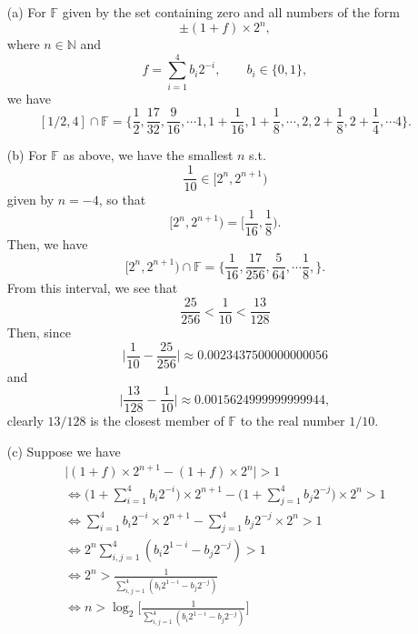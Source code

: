 
\begin{itemize}
    \item[(a)]
        For $\mathbb{F}$ given by the set containing zero and all numbers
        of the form
        \[
           \pm (1 + f) \times 2^n, 
        \]
        where $n \in \mathbb{N}$ and
        \[
            f = \sum_{i=1}^4 b_i 2^{-i}, \qquad b_i \in \lbrace 0, 1 \rbrace,
        \]
        we have
        \[
            [1/2, 4] \cap \mathbb{F} = \biggl\lbrace \frac{1}{2}, \frac{17}{32}, 
            \frac{9}{16}, \dotsb
            1, 1 + \frac{1}{16}, 1 + \frac{1}{8}, \dotsb, 2, 2 + \frac{1}{8},
            2 + \frac{1}{4}, \dotsb 4 \biggr\rbrace.
        \]
    \item[(b)]
        For $\mathbb{F}$ as above, we have the smallest $n$ s.t. 
        \[
            \frac{1}{10} \in [2^n, 2^{n+1})
        \]
        given by $n = -4$, so that
        \[
            [2^n, 2^{n+1}) = \biggl[\frac{1}{16}, \frac{1}{8}\biggr).
        \]
        Then, we have
        \[
            [2^n, 2^{n+1}) \cap \mathbb{F} = \biggl\lbrace \frac{1}{16}, 
            \frac{17}{256}, \frac{5}{64}, \dotsb \frac{1}{8}, \biggr\rbrace.
        \]
        From this interval, we see that
        \[
            \frac{25}{256} < \frac{1}{10} < \frac{13}{128}
        \]
        Then, since 
        \[
            \biggl\lvert \frac{1}{10} - \frac{25}{256} \biggr\rvert \approx 
            0.0023437500000000056
        \]
        and
        \[
            \biggl\lvert \frac{13}{128} - \frac{1}{10} \biggr\rvert \approx 
            0.0015624999999999944,
        \]
        clearly $13/128$ is the closest member of $\mathbb{F}$ to the real number 
        $1/10$.
    \item[(c)]
        Suppose we have 
        \begin{equation*}
            \begin{split}
                \lvert (1 + f) \times 2^{n+1} - (1 + f) \times 2^n \rvert > 1 \\
                \Leftrightarrow \biggl(1 + \sum_{i=1}^4 b_i 2^{-i}\biggr)
                \times 2^{n+1} 
                - \biggl(1 + \sum_{j=1}^4 b_j 2^{-j}\biggr) \times 2^n > 1 \\
                \Leftrightarrow \sum_{i=1}^4 b_i 2^{-i}\times 2^{n+1} 
                - \sum_{j=1}^4 b_j 2^{-j} \times 2^n > 1 \\
                \Leftrightarrow 2^n\sum_{i,j=1}^4 \left(b_i 2^{1-i} 
                - b_j 2^{-j}\right) > 1 \\
                \Leftrightarrow 2^n > \frac{1}{\sum_{i,j=1}^4 \left(b_i 2^{1-i} 
                - b_j 2^{-j}\right)} \\
                \Leftrightarrow n > \log_2 \Biggl[\frac{1}{\sum_{i,j=1}^4 \left(b_i 2^{1-i} 
                - b_j 2^{-j}\right)}\Biggr] \\
            \end{split}
        \end{equation*}
\end{itemize}
